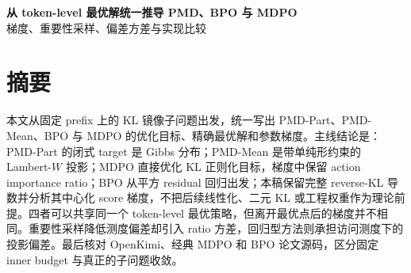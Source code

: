 \frontmatter
\begin{center}
{\bfseries\LARGE 从 token-level 最优解统一推导 PMD、BPO 与 MDPO}\\[1.5ex]
{\large 梯度、重要性采样、偏差方差与实现比较}
\end{center}
\vspace{2ex}

\chapter*{摘要}
本文从固定 prefix 上的 KL 镜像子问题出发，统一写出 PMD-Part、PMD-Mean、BPO 与 MDPO 的优化目标、精确最优解和参数梯度。主线结论是：PMD-Part 的闭式 target 是 Gibbs 分布；PMD-Mean 是带单纯形约束的 Lambert-$W$ 投影；MDPO 直接优化 KL 正则化目标，梯度中保留 action importance ratio；BPO 从平方 residual 回归出发；本稿保留完整 reverse-KL 导数并分析其中心化 score 梯度，不把后续线性化、二元 KL 或工程权重作为理论前提。四者可以共享同一个 token-level 最优策略，但离开最优点后的梯度并不相同。重要性采样降低测度偏差却引入 ratio 方差，回归型方法则承担访问测度下的投影偏差。最后核对 OpenKimi、经典 MDPO 和 BPO 论文源码，区分固定 inner budget 与真正的子问题收敛。

\tableofcontents
